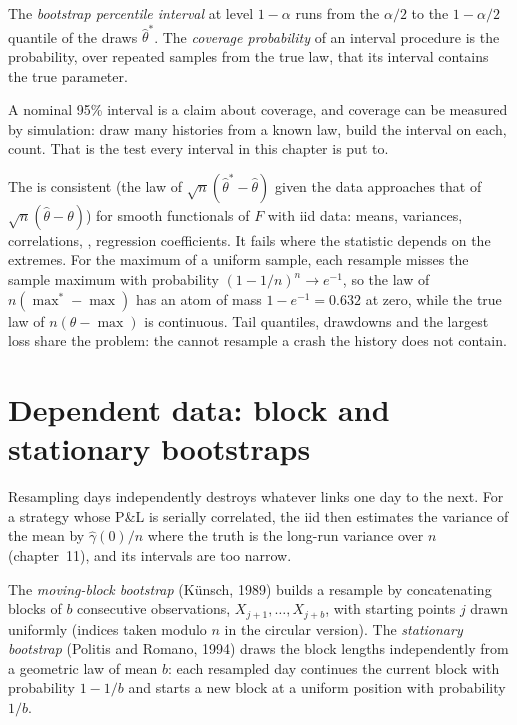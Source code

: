 \begin{definition}\label{def:qm:resampling:interval}
The \emph{bootstrap percentile interval} at level $1 - \alpha$ runs from the $\alpha/2$ to the $1 -
\alpha/2$ quantile of the  draws $\hat\theta^*$. The \emph{coverage probability} of an interval
procedure is the probability, over repeated samples from the true law, that its interval contains the true parameter.
\end{definition}

A nominal 95\% interval is a claim about coverage, and coverage can be measured by simulation: draw many histories from a known
law, build the interval on each, count. That is the test every interval in this chapter is put to.

The  is consistent (the law of $\sqrt n(\hat\theta^* - \hat\theta)$ given the data approaches that of $\sqrt n(\hat\theta -
\theta)$) for smooth functionals of $F$ with iid data: means, variances, correlations, , regression coefficients. It fails
where the statistic depends on the extremes. For the maximum of a uniform sample, each resample misses the sample maximum with
probability $(1 - 1/n)^n \to e^{-1}$, so the  law of $n(\max^* - \max)$ has an atom of mass $1 - e^{-1} = 0.632$ at zero,
while the true law of $n(\theta - \max)$ is continuous. Tail quantiles, drawdowns and the largest loss share the problem: the
 cannot resample a crash the history does not contain.

\section{Dependent data: block and stationary bootstraps}

Resampling days independently destroys whatever links one day to the next. For a strategy whose P\&L is serially correlated, the
iid  then estimates the variance of the mean by $\hat\gamma(0)/n$ where the truth is the long-run variance over $n$
(chapter~11), and its intervals are too narrow.

\begin{definition}\label{def:qm:resampling:blocks}
The \emph{moving-block bootstrap} (Künsch, 1989) builds a resample by concatenating blocks of $b$
consecutive observations, $X_{j+1}, \dots, X_{j+b}$, with starting points $j$ drawn uniformly (indices taken modulo $n$ in the
circular version). The \emph{stationary bootstrap} (Politis and Romano, 1994) draws the block lengths
independently from a geometric law of mean $b$: each resampled day continues the current block with probability $1 - 1/b$ and
starts a new block at a uniform position with probability $1/b$.
\end{definition}

